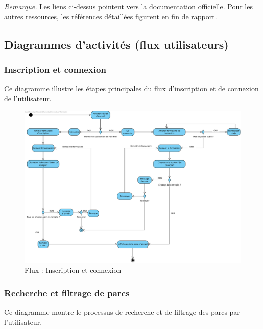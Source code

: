 \documentclass[12pt,a4paper]{article}
\begin{document}
\medskip
\noindent\textit{Remarque.} Les liens ci-dessus pointent vers la documentation officielle. Pour les autres ressources, les références détaillées figurent en fin de rapport.


\subsection{Diagrammes d'activités (flux utilisateurs)}

\subsubsection{Inscription et connexion}

Ce diagramme illustre les étapes principales du flux d'inscription et de connexion de l'utilisateur.

\begin{figure}[H]
  \centering
  \includegraphics[width=0.9\linewidth]{attachments/Inscription_Connexion.pdf}
  \caption{Flux : Inscription et connexion}
\end{figure}

\subsubsection{Recherche et filtrage de parcs}

Ce diagramme montre le processus de recherche et de filtrage des parcs par l'utilisateur.
\end{document}

